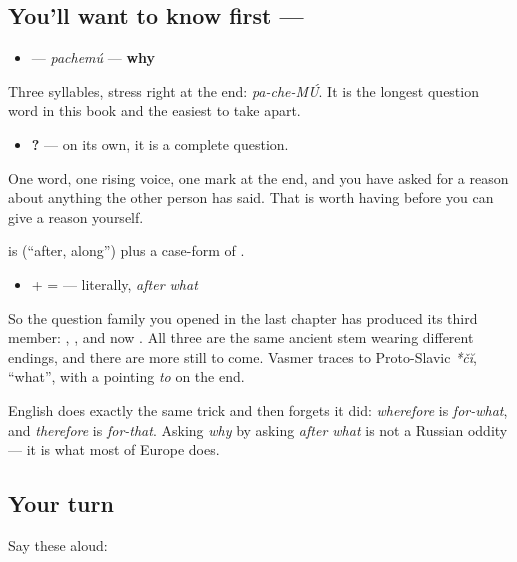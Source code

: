 \subsection*{You'll want to know first — }
\begin{itemize}
\raggedright
  \item \textbf{} — \emph{pachemú} — \textbf{why}
\end{itemize}

Three syllables, stress right at the end: \emph{pa-che-MÚ}. It is the longest question word in this book and the easiest to take apart.

\begin{itemize}
\raggedright
  \item \textbf{?} — on its own, it is a complete question.
\end{itemize}

One word, one rising voice, one mark at the end, and you have asked for a reason about anything the other person has said. That is worth having before you can give a reason yourself.

\begin{cousinweb}
\textbf{} is \textbf{} (\textquotedblleft{}after, along\textquotedblright{}) plus a case-form of \textbf{}.

\begin{itemize}
\raggedright
  \item \textbf{} + \textbf{} = \textbf{} — literally, \emph{after what}
\end{itemize}

So the question family you opened in the last chapter has produced its third member: \textbf{}, \textbf{}, and now \textbf{}. All three are the same ancient stem wearing different endings, and there are more still to come. Vasmer traces \textbf{} to Proto-Slavic \emph{*čĭ}, \textquotedblleft{}what\textquotedblright{}, with a pointing \emph{to} on the end.

English does exactly the same trick and then forgets it did: \emph{wherefore} is \emph{for-what}, and \emph{therefore} is \emph{for-that}. Asking \emph{why} by asking \emph{after what} is not a Russian oddity — it is what most of Europe does.
\end{cousinweb}

\subsection*{Your turn}
Say these aloud:

